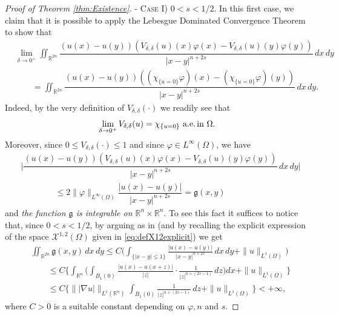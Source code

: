 \documentclass[11pt,a4paper]{amsart}
\def \R {\mathbb{R}}
\theoremstyle{definition}
\theoremstyle{plain}
\numberwithin{equation}{section}
\begin{document}
{\begin{proof}[Proof of Theorem \ref{thm:Existence}]
-\,\,\textsc{Case I) $0<s<1/2$.} In this first case, we claim that it is possible to
apply the Le\-be\-sgue Dominated Convergence Theorem to show that
\begin{equation} \label{eq:toProveWithDCTLows}
\begin{split}
 & \lim_{\delta\to 0^+}
  \iint_{\R^{2n}}\dfrac{(u(x)-u(y))(V_{\delta,\delta}(u)(x)\varphi(x)-
  V_{\delta,\delta}(u)(y)\varphi(y))}{|x-y|^{n+2s}}\,dx\,dy \\
  & \qquad
  = \iint_{\R^{2n}}\dfrac{(u(x)-u(y))((\chi_{\{u = 0\}}\varphi)(x)-
 (\chi_{\{u = 0\}}\varphi)(y))}{|x-y|^{n+2s}}\,dx\,dy.
\end{split}  
\end{equation}
Indeed, by the very definition of $V_{\delta,\delta}(\cdot)$ we readily see that
$$\text{$\lim_{\delta\to 0^+}V_{\delta,\delta}(u) = \chi_{\{u = 0\}}$ a.e.\,in $\Omega$}.$$
Moreover, since $0\leq V_{\delta,\delta}(\cdot)\leq 1$ and since $\varphi\in L^\infty(\Omega)$, we have
\begin{equation*}
\begin{split}
 & \Big|\dfrac{(u(x)-u(y))(V_{\delta,\delta}(u)(x)\varphi(x)-
  V_{\delta,\delta}(u)(y)\varphi(y))}{|x-y|^{n+2s}}\,dx\,dy\Big| \\
  & \qquad\qquad\leq 2\|\varphi\|_{L^\infty(\Omega)}
  \dfrac{|u(x)-u(y)|}{|x-y|^{n+2s}} = \mathfrak{g}(x,y)
  \end{split}
 \end{equation*}
and \emph{the function $\mathfrak{g}$ is integrable on $\R^n\times\R^n$}. To see this fact it suffices
to notice that,
since $0<s<1/2$, by arguing as in \cite[Proposition 2.2]{DRV} 
(and by recalling the explicit expression of the space $\mathcal{X}^{1,2}(\Omega)$ given in
 \eqref{eq:defX12explicit}) we get
\begin{align*}
 & \iint_{\R^{2n}}\mathfrak{g}(x,y)\,dx\,dy 
 \leq C
 \Big(\int_{\{|x-y|\leq 1\}}\frac{|u(x)-u(y)|}{|x-y|^{n+2s}}\,dx\,dy
 +\|u\|_{L^1(\Omega)}\Big) \\
 & \qquad
 \leq C\Big\{\int_{\R^n}\Big(\int_{B_1(0)}\frac{|u(x)-u(x+z)|}{|z|}\cdot\frac{1}{|z|^{n+(2s-1)}}\,dz\Big)dx
 + \|u\|_{L^1(\Omega)}\Big\} \\
 & \qquad
 \leq C\Big\{\||\nabla u|\|_{L^1(\R^n)}\int_{B_1(0)}\frac{1}{|z|^{n+(2s-1)}}\,dz
 + \|u\|_{L^1(\Omega)}\Big\} < +\infty,
\end{align*}
where $C > 0$ is a suitable constant depending on $\varphi,n$ and $s$.


\end{proof}}
\end{document}
